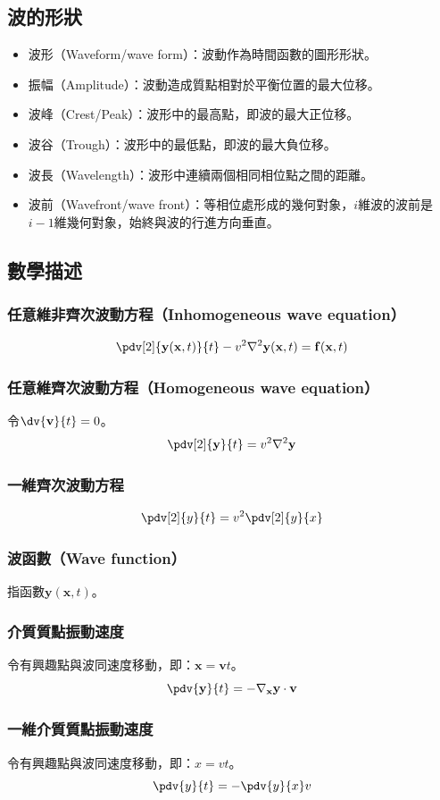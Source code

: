 \documentclass[a4paper,12pt]{report}
\begin{document}
\subsection{波的形狀}
\begin{itemize}
\item 波形（Waveform/wave form）：波動作為時間函數的圖形形狀。
\item 振幅（Amplitude）：波動造成質點相對於平衡位置的最大位移。
\item 波峰（Crest/Peak）：波形中的最高點，即波的最大正位移。
\item 波谷（Trough）：波形中的最低點，即波的最大負位移。
\item 波長（Wavelength）：波形中連續兩個相同相位點之間的距離。
\item 波前（Wavefront/wave front）：等相位處形成的幾何對象，$i$維波的波前是$i-1$維幾何對象，始終與波的行進方向垂直。
\end{itemize}
\subsection{數學描述}
\subsubsection{任意維非齊次波動方程（Inhomogeneous wave equation）}
\[\pdv[2]{\mathbf{y}(\mathbf{x},t)}{t}-v^2\nabla^2\mathbf{y}(\mathbf{x},t)=\mathbf{f}(\mathbf{x},t)\]
\subsubsection{任意維齊次波動方程（Homogeneous wave equation）}
令$\dv{\mathbf{v}}{t}=0$。
\[\pdv[2]{\mathbf{y}}{t}=v^2\nabla^2\mathbf{y}\]
\subsubsection{一維齊次波動方程}
\[\pdv[2]{y}{t}=v^2\pdv[2]{y}{x}\]
\subsubsection{波函數（Wave function）}
指函數\(\mathbf{y}(\mathbf{x},t)\)。
\subsubsection{介質質點振動速度}
令有興趣點與波同速度移動，即：$\mathbf{x}=\mathbf{v}t$。
\[\pdv{\mathbf{y}}{t} = - \nabla_{\mathbf{x}} \mathbf{y} \cdot \mathbf{v}\]
\subsubsection{一維介質質點振動速度}
令有興趣點與波同速度移動，即：$x=vt$。
\[ \pdv{y}{t}=-\pdv{y}{x}v \]
\end{document}
